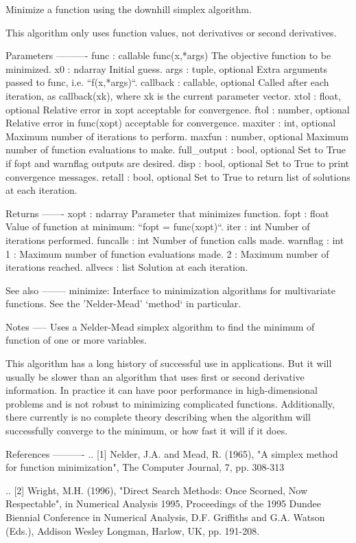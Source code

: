 \begin{DoxyVerb}Minimize a function using the downhill simplex algorithm.

This algorithm only uses function values, not derivatives or second
derivatives.

Parameters
----------
func : callable func(x,*args)
    The objective function to be minimized.
x0 : ndarray
    Initial guess.
args : tuple, optional
    Extra arguments passed to func, i.e. ``f(x,*args)``.
callback : callable, optional
    Called after each iteration, as callback(xk), where xk is the
    current parameter vector.
xtol : float, optional
    Relative error in xopt acceptable for convergence.
ftol : number, optional
    Relative error in func(xopt) acceptable for convergence.
maxiter : int, optional
    Maximum number of iterations to perform.
maxfun : number, optional
    Maximum number of function evaluations to make.
full_output : bool, optional
    Set to True if fopt and warnflag outputs are desired.
disp : bool, optional
    Set to True to print convergence messages.
retall : bool, optional
    Set to True to return list of solutions at each iteration.

Returns
-------
xopt : ndarray
    Parameter that minimizes function.
fopt : float
    Value of function at minimum: ``fopt = func(xopt)``.
iter : int
    Number of iterations performed.
funcalls : int
    Number of function calls made.
warnflag : int
    1 : Maximum number of function evaluations made.
    2 : Maximum number of iterations reached.
allvecs : list
    Solution at each iteration.

See also
--------
minimize: Interface to minimization algorithms for multivariate
    functions. See the 'Nelder-Mead' `method` in particular.

Notes
-----
Uses a Nelder-Mead simplex algorithm to find the minimum of function of
one or more variables.

This algorithm has a long history of successful use in applications.
But it will usually be slower than an algorithm that uses first or
second derivative information. In practice it can have poor
performance in high-dimensional problems and is not robust to
minimizing complicated functions. Additionally, there currently is no
complete theory describing when the algorithm will successfully
converge to the minimum, or how fast it will if it does.

References
----------
.. [1] Nelder, J.A. and Mead, R. (1965), "A simplex method for function
       minimization", The Computer Journal, 7, pp. 308-313

.. [2] Wright, M.H. (1996), "Direct Search Methods: Once Scorned, Now
       Respectable", in Numerical Analysis 1995, Proceedings of the
       1995 Dundee Biennial Conference in Numerical Analysis, D.F.
       Griffiths and G.A. Watson (Eds.), Addison Wesley Longman,
       Harlow, UK, pp. 191-208.\end{DoxyVerb}
 \hypertarget{namespacescipy_1_1optimize_1_1optimize_a114d58b070f13613387e7a33b268fc62}{}
